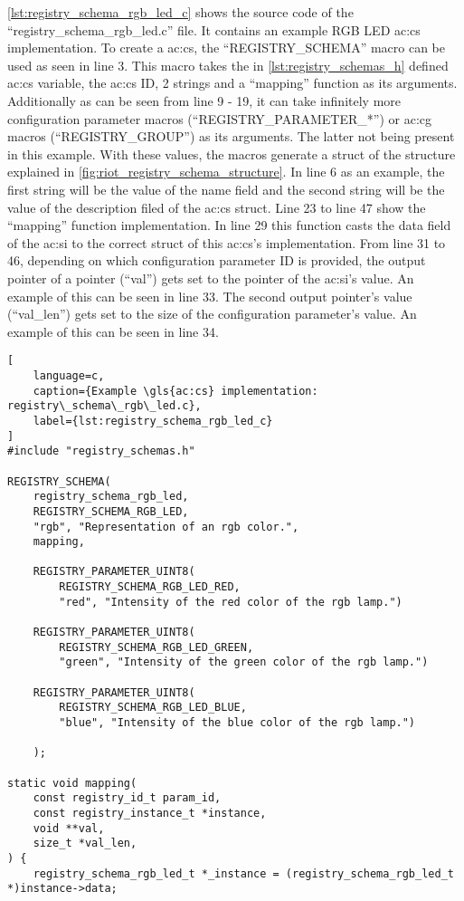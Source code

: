 {\autoref{lst:registry_schema_rgb_led_c} shows the source code of the ``registry\_schema\_rgb\_led.c'' file. It contains an example RGB LED \gls{ac:cs} implementation.
To create a \gls{ac:cs}, the ``REGISTRY\_SCHEMA'' macro can be used as seen in line 3.
This macro takes the in \autoref{lst:registry_schemas_h} defined \gls{ac:cs} variable, the \gls{ac:cs} ID, 2 strings and a ``mapping'' function as its arguments.
Additionally as can be seen from line 9 - 19, it can take infinitely more configuration parameter macros (``REGISTRY\_PARAMETER\_*'') or \gls{ac:cg} macros (``REGISTRY\_GROUP'') as its arguments. The latter not being present in this example.
With these values, the macros generate a struct of the structure explained in \autoref{fig:riot_registry_schema_structure}.
In line 6 as an example, the first string will be the value of the name field and the second string will be the value of the description filed of the \gls{ac:cs} struct.
Line 23 to line 47 show the ``mapping'' function implementation.
In line 29 this function casts the data field of the \gls{ac:si} to the correct struct of this \gls{ac:cs}'s implementation.
From line 31 to 46, depending on which configuration parameter ID is provided, the output pointer of a pointer (``val'') gets set to the pointer of the \gls{ac:si}'s value. An example of this can be seen in line 33. The second output pointer's value (``val\_len'') gets set to the size of the configuration parameter's value. An example of this can be seen in line 34.

\begin{lstlisting}[
    language=c,
    caption={Example \gls{ac:cs} implementation: registry\_schema\_rgb\_led.c},
    label={lst:registry_schema_rgb_led_c}
]
#include "registry_schemas.h"

REGISTRY_SCHEMA(
    registry_schema_rgb_led,
    REGISTRY_SCHEMA_RGB_LED,
    "rgb", "Representation of an rgb color.",
    mapping,

    REGISTRY_PARAMETER_UINT8(
        REGISTRY_SCHEMA_RGB_LED_RED,
        "red", "Intensity of the red color of the rgb lamp.")

    REGISTRY_PARAMETER_UINT8(
        REGISTRY_SCHEMA_RGB_LED_GREEN,
        "green", "Intensity of the green color of the rgb lamp.")

    REGISTRY_PARAMETER_UINT8(
        REGISTRY_SCHEMA_RGB_LED_BLUE,
        "blue", "Intensity of the blue color of the rgb lamp.")

    );

static void mapping(
    const registry_id_t param_id,
    const registry_instance_t *instance,
    void **val,
    size_t *val_len,
) {
    registry_schema_rgb_led_t *_instance = (registry_schema_rgb_led_t *)instance->data;


\end{lstlisting}}
